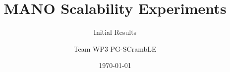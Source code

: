 \title{MANO Scalability Experiments} 

\subtitle{Initial Results}

\author{Team WP3 PG-SCrambLE}


\date{\today} 

\newcommand{\upbcolor}{uni-blue} 


